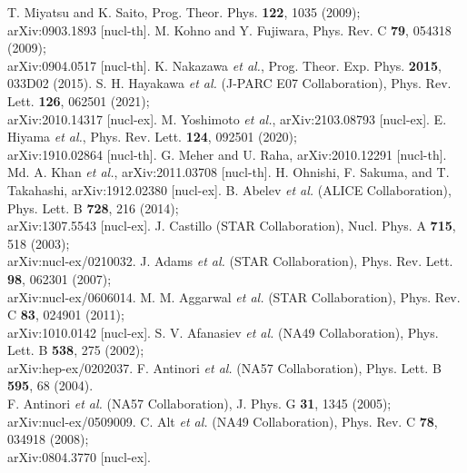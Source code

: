 \documentclass[12pt]{article}
\begin{document}
\begin{thebibliography}{99}
 T. Miyatsu and K. Saito,  Prog. Theor. Phys. {\bf 122}, 1035 (2009);\\
                                        arXiv:0903.1893 [nucl-th].
 M. Kohno and Y. Fujiwara, Phys. Rev. C {\bf 79}, 054318 (2009);\\
                                    arXiv:0904.0517 [nucl-th].
 K. Nakazawa {\it et al.}, Prog. Theor. Exp. Phys. {\bf 2015}, 033D02 (2015).
 S. H. Hayakawa {\it et al.} (J-PARC E07 Collaboration), Phys. Rev. Lett. {\bf 126}, 062501 (2021);\\
                            arXiv:2010.14317 [nucl-ex].
 M. Yoshimoto {\it et al.}, arXiv:2103.08793 [nucl-ex].
 E. Hiyama {\it et al.}, Phys. Rev. Lett. {\bf 124}, 092501 (2020);\\
                            arXiv:1910.02864 [nucl-th].
 G. Meher and U. Raha, arXiv:2010.12291 [nucl-th].
 Md. A. Khan {\it et al.}, arXiv:2011.03708 [nucl-th].
 H. Ohnishi, F. Sakuma, and T. Takahashi, arXiv:1912.02380 [nucl-ex].
 B. Abelev {\it et al.} (ALICE Collaboration), Phys. Lett. B {\bf 728}, 216 (2014);\\
                                  arXiv:1307.5543 [nucl-ex].
 J. Castillo (STAR Collaboration), Nucl. Phys. A {\bf 715}, 518 (2003);\\
                                        arXiv:nucl-ex/0210032.
 J. Adams {\it et al.} (STAR Collaboration), Phys. Rev. Lett. {\bf 98}, 062301 (2007);\\
                            arXiv:nucl-ex/0606014.
 M. M. Aggarwal {\it et al.} (STAR Collaboration), Phys. Rev. C {\bf 83}, 024901 (2011);\\
                                      arXiv:1010.0142 [nucl-ex].
 S. V. Afanasiev {\it et al.} (NA49 Collaboration), Phys. Lett. B {\bf 538}, 275 (2002);\\
                                      arXiv:hep-ex/0202037.
 F. Antinori {\it et al.} (NA57 Collaboration), Phys. Lett. B {\bf 595}, 68 (2004).\\
             F. Antinori {\it et al.} (NA57 Collaboration), J. Phys. G {\bf 31}, 1345 (2005);\\
                                       arXiv:nucl-ex/0509009.
 C. Alt {\it et al.} (NA49 Collaboration), Phys. Rev. C {\bf 78}, 034918 (2008);\\
                                      arXiv:0804.3770 [nucl-ex].

\end{thebibliography}
\end{document}
